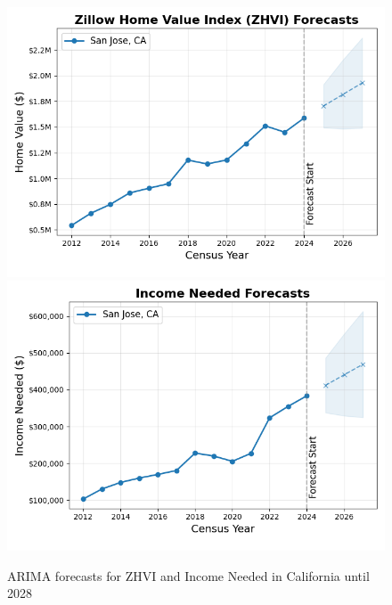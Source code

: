 \documentclass[journal]{IEEEtran}
\begin{document}
\begin{figure}[!htb]
	\centering
	\includegraphics[width=0.45\linewidth]{zhvi_forecasts.png}
	\includegraphics[width=0.45\linewidth]{income_needed_forecasts.png}
	\caption{ARIMA forecasts for ZHVI and Income Needed in California until 2028}
	\label{fig:arima-zillow}
\end{figure}
\end{document}
